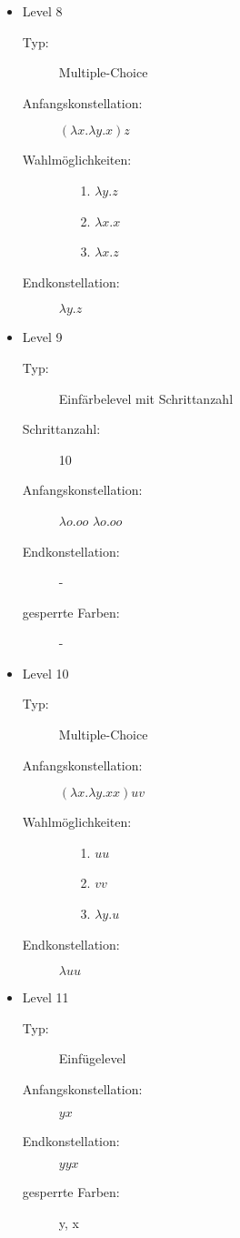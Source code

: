 \begin{itemize}
	\item{Level 8} 
		\begin{description}
			\item[Typ:] Multiple-Choice 
			\item[Anfangskonstellation:] \((\lambda x . \lambda y . x ) z\)    
			\item[Wahlmöglichkeiten:] \hfill
				\begin{itemize}
					\item[1.] \( \lambda y . z\) 
					\item[2.] \( \lambda x . x \) 
					\item[3.] \( \lambda x . z\)
				\end{itemize}
			\item[Endkonstellation:]\( \lambda y . z\)
		\end{description}

	\item{Level 9} 
		\begin{description}
			\item[Typ:] Einfärbelevel mit Schrittanzahl
			\item[Schrittanzahl:] 10
			\item[Anfangskonstellation:] \(\lambda o . o o \)  \(\lambda o . o o \) 
			\item[Endkonstellation:]  -
			\item[gesperrte Farben:] -
		\end{description}

	\item{Level 10} 
		\begin{description}
			\item[Typ:] Multiple-Choice 
			\item[Anfangskonstellation:] \((\lambda x . \lambda y . x x ) u v\)    
			\item[Wahlmöglichkeiten:] \hfill
				\begin{itemize}
					\item[1.] \( u u\) 
					\item[2.] \( v v \) 
					\item[3.] \( \lambda y . u\)
				\end{itemize}
			\item[Endkonstellation:]\( \lambda u u\)
		\end{description}
	
	\item{Level 11} 
		\begin{description}
			\item[Typ:] Einfügelevel
			\item[Anfangskonstellation:] \(y x \)    
			\item[Endkonstellation:] \(y y x\)
			\item[gesperrte Farben:] y, x 
		\end{description}


\end{itemize}
